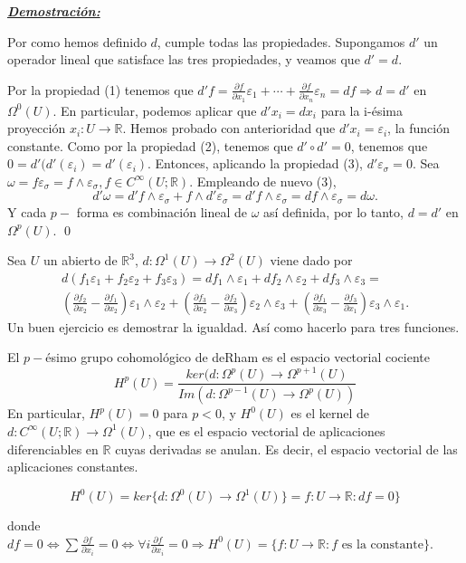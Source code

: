 \underline{\textbf{\textit{Demostración:}}}

Por como hemos definido $d$, cumple todas las propiedades. Supongamos $d'$ un operador lineal que satisface las tres propiedades, y veamos que $d'=d$. 

Por la propiedad (1) tenemos que $d'f=\frac{\partial f}{\partial x_1}\varepsilon_1+\cdots + \frac{\partial f}{\partial x_n}\varepsilon_n = df \Rightarrow d =d'$ en $\Omega^0(U)$. En particular, podemos aplicar que $d'x_i=dx_i$ para la i-ésima proyección $x_i:U\rightarrow \mathbb{R}$. Hemos probado con anterioridad que $d'x_i=\varepsilon_i$, la función constante. Como por la propiedad (2), tenemos que $d'\circ d'=0$, tenemos que $0=d'(d'(\varepsilon_i)=d'(\varepsilon_i)$. Entonces, aplicando la propiedad (3), $d'\varepsilon_\sigma=0$. Sea $\omega=f\varepsilon_\sigma=f\wedge \varepsilon_\sigma,f\in C^\infty(U;\mathbb{R})$. Empleando de nuevo (3),
$$d'\omega=d'f\wedge \varepsilon_\sigma+ f\wedge d'\varepsilon_\sigma = d'f\wedge \varepsilon_\sigma = df\wedge \varepsilon_\sigma = d\omega. $$
Y cada $p-$ forma es combinación lineal de $\omega$ así definida, por lo tanto, $d=d'$ en $\Omega^p(U)$. \qed

\begin{nota}
Sea $U$ un abierto de $\mathbb{R}^3$, $d:\Omega^1(U)\rightarrow \Omega^2(U)$ viene dado por
\begin{equation}
  \begin{split}
    d(f_1\varepsilon_1+f_2\varepsilon_2+f_3\varepsilon_3)=df_1\wedge \varepsilon_1+df_2\wedge \varepsilon_2+df_3\wedge \varepsilon_3 = \\
(\frac{\partial f_2}{\partial x_2}-\frac{\partial f_1}{\partial x_2}) \varepsilon_1\wedge \varepsilon_2 + (\frac{\partial f_3}{\partial x_2}-\frac{\partial f_2}{\partial x_3}) \varepsilon_2\wedge \varepsilon_3+(\frac{\partial f_1}{\partial x_3}-\frac{\partial f_3}{\partial x_1})\varepsilon_3\wedge \varepsilon_1.
  \end{split}
\end{equation}
Un buen ejercicio es demostrar la igualdad.  Así como hacerlo para tres funciones. 
\end{nota}


\begin{Def}
El $p-$ésimo grupo cohomológico de deRham es el espacio vectorial cociente
$$H^p(U)=\frac{ker(d:\Omega^p(U)\rightarrow \Omega^{p+1}(U)}{Im(d:\Omega^{p-1}(U) \rightarrow \Omega^p(U))} $$
En particular, $H^p(U)=0$ para $p<0$, y $H^0(U)$ es el kernel de $d:C^\infty(U;\mathbb{R})\rightarrow \Omega^1(U)$, que es el espacio vectorial de aplicaciones diferenciables en $\mathbb{R}$ cuyas derivadas se anulan. Es decir, el espacio vectorial de las aplicaciones constantes.

$$H^0(U)=ker \{d:\Omega^0(U)\rightarrow \Omega^1(U) \} = f:U\rightarrow \mathbb{R} : df=0 \} $$

donde $df=0 \Leftrightarrow \sum \frac{\partial f}{\partial x_i} =0 \Leftrightarrow \forall i \frac{\partial f}{\partial x_i}=0 \Rightarrow H^0(U)=\{f:U \rightarrow \mathbb{R}: f\text{ es la constante} \}$. 
\end{Def}

